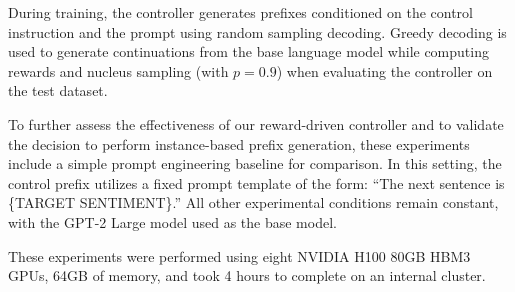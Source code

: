 \documentclass[phd,electronic,oneside,twosidetoc,letterpaper,chaptercenter,parttop,lof]{byumsphd}
\begin{document}
During training, the controller generates prefixes conditioned on the control instruction and the prompt using random sampling decoding. 
Greedy decoding is used to generate continuations from the base language model while computing rewards and nucleus sampling (with \(p=0.9\)) when evaluating the controller on the test dataset. 

To further assess the effectiveness of our reward-driven controller and to validate the decision to perform instance-based prefix generation, these experiments include a simple prompt engineering baseline for comparison. In this setting, the control prefix utilizes a fixed prompt template of the form: ``The next sentence is \{TARGET SENTIMENT\}.'' All other experimental conditions remain constant, with the GPT-2 Large model used as the base model.

These experiments were performed using eight NVIDIA H100 80GB HBM3 GPUs, 64GB of memory, and took 4 hours to complete on an internal cluster.
\end{document}
